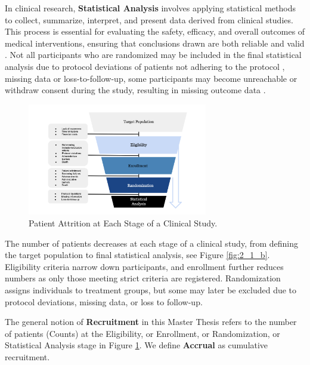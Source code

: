 In clinical research, \textbf{Statistical Analysis} involves applying statistical methods to collect, summarize, interpret, and present data derived from clinical studies. This process is essential for evaluating the safety, efficacy, and overall outcomes of medical interventions, ensuring that conclusions drawn are both reliable and valid \citep{panos2023statistical}. Not all participants who are randomized may be included in the final statistical analysis due to protocol deviations of patients not adhering to the protocol \citep{rehman2020exclusion}, missing data \citep{shih2002problems} or loss-to-follow-up, some participants may become unreachable or withdraw consent during the study, resulting in missing outcome data \citep{nuesch2009effects}.

\begin{figure}[h]
  \centering
  \includegraphics[width=0.7\textwidth]{fig_2_1_a.png}
  \caption{Patient Attrition at Each Stage of a Clinical Study.  \citep{piantadosi2022principles, whelan2018high, bogin2022lasagna}}
  \label{fig:2_1_a}
\end{figure}

The number of patients decreases at each stage of a clinical study, from defining the target population to final statistical analysis, see Figure \ref{fig:2_1_b}. Eligibility criteria narrow down participants, and enrollment further reduces numbers as only those meeting strict criteria are registered. Randomization assigns individuals to treatment groups, but some may later be excluded due to protocol deviations, missing data, or loss to follow-up. 

The general notion of \textbf{Recruitment} in this Master Thesis refers to the number of patients (Counts) at the Eligibility, or Enrollment, or Randomization, or Statistical Analysis stage in Figure \ref{fig:2_1_a}. We define \textbf{Accrual} as cumulative recruitment.

